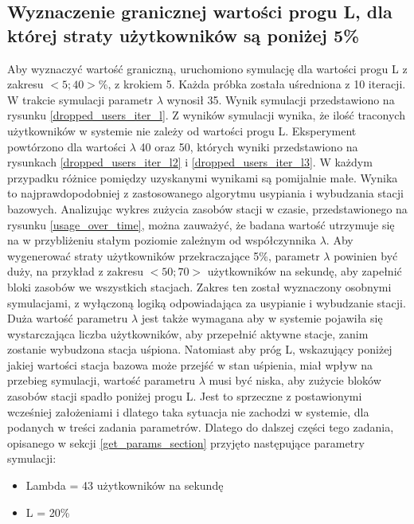 \subsection{Wyznaczenie granicznej wartości progu L, dla której straty użytkowników są poniżej 5\%}\label{drop_rate_5_section}
Aby wyznaczyć wartość graniczną, uruchomiono symulację dla wartości progu L z zakresu $<5; 40>\%$, z krokiem 5. Każda próbka została uśredniona z 10 iteracji. W trakcie symulacji parametr $\lambda$ wynosił 35. Wynik symulacji przedstawiono na rysunku \ref{dropped_users_iter_l}. Z wyników symulacji wynika, że ilość traconych użytkowników w systemie nie zależy od wartości progu L. Eksperyment powtórzono dla wartości $\lambda$ 40 oraz 50, których wyniki przedstawiono na rysunkach \ref{dropped_users_iter_l2} i \ref{dropped_users_iter_l3}. W każdym przypadku różnice pomiędzy uzyskanymi wynikami są pomijalnie małe. Wynika to najprawdopodobniej z zastosowanego algorytmu usypiania i wybudzania stacji bazowych. Analizując wykres zużycia zasobów stacji w czasie, przedstawionego na rysunku \ref{usage_over_time}, można zauważyć, że badana wartość utrzymuje się na w przybliżeniu stałym poziomie zależnym od współczynnika $\lambda$. Aby wygenerować straty użytkowników przekraczające 5\%, parametr $\lambda$ powinien być duży, na przykład z zakresu $<50;70>$ użytkowników na sekundę, aby zapełnić bloki zasobów we wszystkich stacjach. Zakres ten został wyznaczony osobnymi symulacjami, z wyłączoną logiką odpowiadająca za usypianie i wybudzanie stacji. Duża wartość parametru $\lambda$ jest także wymagana aby w systemie pojawiła się wystarczająca liczba użytkowników, aby przepełnić aktywne stacje, zanim zostanie wybudzona stacja uśpiona. Natomiast aby próg L, wskazujący poniżej jakiej wartości stacja bazowa może przejść w stan uśpienia, miał wpływ na przebieg symulacji, wartość parametru $\lambda$ musi być niska, aby zużycie bloków zasobów stacji spadło poniżej progu L. Jest to sprzeczne z postawionymi wcześniej założeniami i dlatego taka sytuacja nie zachodzi w systemie, dla podanych w treści zadania parametrów. Dlatego do dalszej części tego zadania, opisanego w sekcji \ref{get_params_section} przyjęto następujące parametry symulacji:
\begin{itemize}
\item Lambda = 43 użytkowników na sekundę
\item L = 20\%
\end{itemize}

